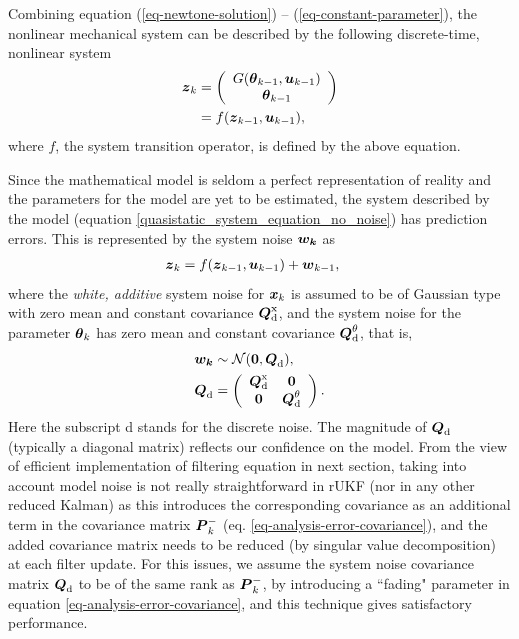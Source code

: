 Combining equation (\ref{eq-newtone-solution}) -- (\ref{eq-constant-parameter}), the nonlinear mechanical system can be described by the following discrete-time, nonlinear system
\begin{align}
\vect{z}_k &= \left( \begin{array}{c} G(\vect{\theta}_{k-1},\vect{u}_{k-1})\\  \vect{\theta}_{k-1} \\ \end{array} \right)  \\
    &= f(\vect{z}_{k-1},\vect{u}_{k-1})  \label{quasistatic_system_equation_no_noise},
\end{align}
where $f$, the system transition operator, is defined by the above equation.

Since the mathematical model is seldom a perfect representation of reality and the parameters for the model are yet to be estimated, the system described by the model (equation \ref{quasistatic_system_equation_no_noise}) has prediction errors. This is represented by the system noise $\vect{w_k}$ as
\begin{align}
\vect{z}_k &= f(\vect{z}_{k-1},\vect{u}_{k-1}) + \vect{w}_{k-1}, \label{quasistatic_system_equation}
\end{align}
where the \emph{white, additive} system noise for $\vect{x}_k$ is assumed to be of Gaussian type with zero mean and constant covariance $\matr{Q}_\textnormal{d}^\textnormal{x}$, and  the system noise for the parameter $\vect{\theta}_k$ has zero mean and constant covariance $\matr{Q}_\textnormal{d}^\theta$, that is,
\begin{align}
\vect{w_k} &\sim \Normal(\vect{0}, \matr{Q}_\textnormal{d}),\\
\matr{Q}_\textnormal{d} &= \left( \begin{array}{cc}  \matr{Q}_\textnormal{d}^\textnormal{x} & \matr{0} \\ \matr{0} & \matr{Q}_\textnormal{d}^\theta \\ \end{array} \right).
\end{align}
Here the subscript d stands for the discrete noise. The magnitude of $\matr{Q}_\textnormal{d}$ (typically a diagonal matrix) reflects our confidence on the model. From the view of efficient implementation of filtering equation in next section, taking into account model noise is not really straightforward in rUKF (nor in any other reduced Kalman) as this introduces the corresponding covariance as an additional term in the covariance matrix $\matr{P}_k^-$ (eq. \ref{eq-analysis-error-covariance}), and the added covariance matrix needs to be reduced (by singular value decomposition) at each filter update. For this issues, we assume the system noise covariance matrix $\matr{Q}_\textnormal{d}$ to be of the same rank as $\matr{P}_k^-$, by introducing a ``fading" parameter in equation \ref{eq-analysis-error-covariance}, and this technique gives satisfactory performance.

